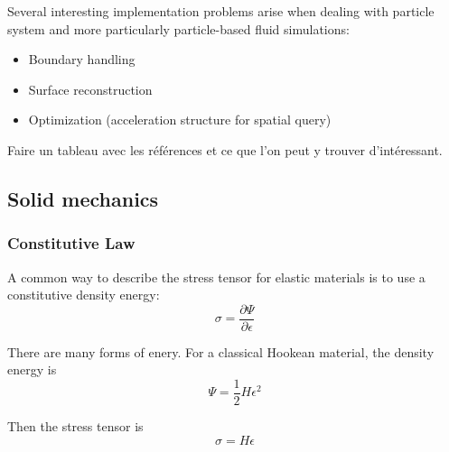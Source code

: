 Several interesting implementation problems arise when dealing with particle system and more particularly particle-based fluid simulations:

\begin{itemize}
\item Boundary handling 
\item Surface reconstruction
\item Optimization (acceleration structure for spatial query)
\end{itemize}

Faire un tableau avec les références et ce que l'on peut y trouver d'intéressant.


\subsection{Solid mechanics}

\subsubsection{Constitutive Law}
A common way to describe the stress tensor for elastic materials is to use a constitutive density energy:
\begin{equation}
\sigma = \frac{\partial \Psi}{\partial \epsilon}
\end{equation}

There are many forms of enery. For a classical Hookean material, the density energy is
\begin{equation}
\Psi = \frac{1}{2}H\epsilon^{2}
\end{equation}

Then the stress tensor is
\begin{equation}
\sigma = H\epsilon
\end{equation}

